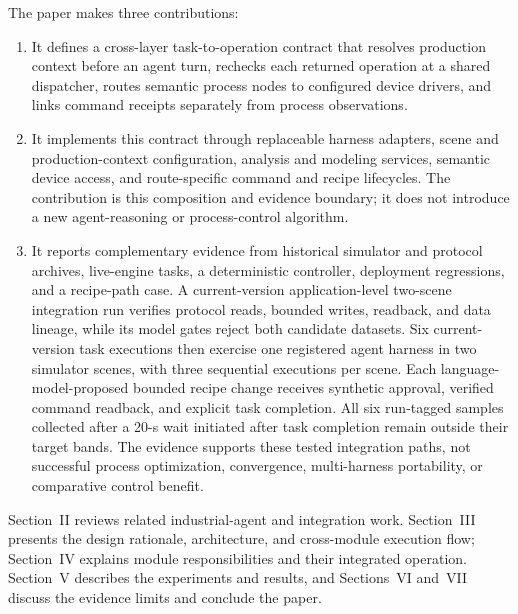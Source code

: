 The paper makes three contributions:
\begin{enumerate}
\item It defines a cross-layer task-to-operation contract that resolves
  production context before an agent turn, rechecks each returned operation
  at a shared dispatcher, routes semantic process nodes to configured device
  drivers, and links command receipts separately from process observations.
\item It implements this contract through replaceable harness adapters,
  scene and production-context configuration, analysis and modeling
  services, semantic device access, and route-specific command and recipe
  lifecycles. The contribution is this composition and evidence boundary;
  it does not introduce a new agent-reasoning or process-control algorithm.
\item It reports complementary evidence from historical simulator and
  protocol archives, live-engine tasks, a deterministic controller,
  deployment regressions, and a recipe-path case. A current-version
  application-level two-scene integration run verifies protocol reads,
  bounded writes,
  readback, and data lineage, while its model gates reject both candidate
  datasets. Six current-version task executions then exercise one registered
  agent harness in two simulator scenes, with three sequential executions per
  scene. Each language-model-proposed bounded recipe change receives synthetic
  approval, verified command readback, and explicit task completion. All six
  run-tagged samples collected after a 20-s wait initiated after task
  completion remain outside their target bands.
  The evidence supports these tested integration paths, not successful
  process optimization, convergence, multi-harness portability, or
  comparative control benefit.
\end{enumerate}

Section~II reviews related industrial-agent and integration work.
Section~III presents the design rationale, architecture, and cross-module
execution flow; Section~IV explains module responsibilities and their
integrated operation. Section~V describes the experiments and results, and
Sections~VI and~VII discuss the evidence limits and conclude the paper.
